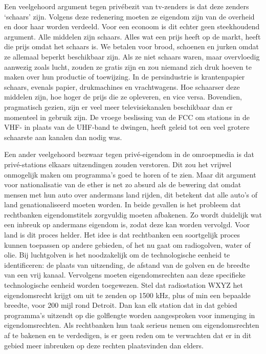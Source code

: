 \documentclass[
  a5paper,
  smalldemyvopaper,10pt,twoside,onecolumn,openright,extrafontsizes,hidelinks]{memoir}
\begin{document}
Een veelgehoord argument tegen privébezit van tv-zenders is dat deze
zenders `schaars' zijn. Volgens deze redenering moeten ze eigendom zijn
van de overheid en door haar worden verdeeld. Voor een econoom is dit
echter geen steekhoudend argument. Alle middelen zijn schaars. Alles wat
een prijs heeft op de markt, heeft die prijs omdat het schaars is. We
betalen voor brood, schoenen en jurken omdat ze allemaal beperkt
beschikbaar zijn. Als ze niet schaars waren, maar overvloedig aanwezig
zoals lucht, zouden ze gratis zijn en zou niemand zich druk hoeven te
maken over hun productie of toewijzing. In de persindustrie is
krantenpapier schaars, evenals papier, drukmachines en vrachtwagens. Hoe
schaarser deze middelen zijn, hoe hoger de prijs die ze opleveren, en
vice versa. Bovendien, pragmatisch gezien, zijn er veel meer
televisiekanalen beschikbaar dan er momenteel in gebruik zijn. De vroege
beslissing van de FCC om stations in de VHF- in plaats van de UHF-band
te dwingen, heeft geleid tot een veel grotere schaarste aan kanalen dan
nodig was.

Een ander veelgehoord bezwaar tegen privé-eigendom in de omroepmedia is
dat privé-stations elkaars uitzendingen zouden verstoren. Dit zou het
vrijwel onmogelijk maken om programma's goed te horen of te zien. Maar
dit argument voor nationalisatie van de ether is net zo absurd als de
bewering dat omdat mensen met hun auto over andermans land rijden, dit
betekent dat alle auto's of land genationaliseerd moeten worden. In
beide gevallen is het probleem dat rechtbanken eigendomstitels
zorgvuldig moeten afbakenen. Zo wordt duidelijk wat een inbreuk op
andermans eigendom is, zodat deze kan worden vervolgd. Voor land is dit
proces helder. Het idee is dat rechtbanken een soortgelijk proces kunnen
toepassen op andere gebieden, of het nu gaat om radiogolven, water of
olie. Bij luchtgolven is het noodzakelijk om de technologische eenheid
te identificeren: de plaats van uitzending, de afstand van de golven en
de breedte van een vrij kanaal. Vervolgens moeten eigendomsrechten aan
deze specifieke technologische eenheid worden toegewezen. Stel dat
radiostation WXYZ het eigendomsrecht krijgt om uit te zenden op 1500
kHz, plus of min een bepaalde breedte, voor 200 mijl rond Detroit. Dan
kan elk station dat in dat gebied programma's uitzendt op die golflengte
worden aangesproken voor inmenging in eigendomsrechten. Als rechtbanken
hun taak serieus nemen om eigendomsrechten af te bakenen en te
verdedigen, is er geen reden om te verwachten dat er in dit gebied meer
inbreuken op deze rechten plaatsvinden dan elders.
\end{document}
